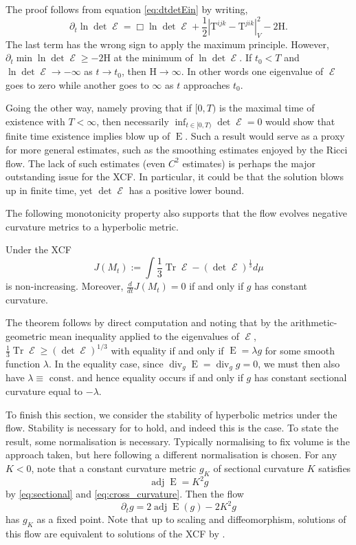 \documentclass{cambridge7a}
\renewcommand{\~}{\tilde}
\renewcommand{\-}{\bar}
\newcommand{\8}{\infty}
\newcommand{\abs}[1]{\left\lvert{#1}\right\rvert}
\DeclareMathOperator{\Tr}{Tr}
\DeclareMathOperator{\dive}{div}
\DeclareMathOperator{\Ein}{E}
\DeclareMathOperator{\opEin}{\mathcal{E}}
\DeclareMathOperator{\adj}{adj}
\begin{document}
The proof follows from equation \eqref{eq:dtdetEin} by writing,
\[
\partial_t \ln \det \opEin = \Box \ln \det \opEin + \frac{1}{2}\abs{\mathrm{T}^{ijk} - \mathrm{T}^{jik}}_V^2- 2 \mathrm{H}.
\]
The last term has the wrong sign to apply the maximum principle. However, \(\partial_t \min \ln \det\opEin \geq -2 \mathrm{H}\) at the minimum of \(\ln \det\opEin\). If $t_0<T$ and \(\ln\det\opEin \to -\infty\) as $t\to t_0$, then \(\mathrm{H} \to \infty\). In other words one eigenvalue of \(\opEin\) goes to zero while another goes to \(\infty\) as $t$ approaches $t_0$.

Going the other way, namely proving that if \([0, T)\) is the maximal time of existence with \(T < \infty\), then necessarily \(\inf_{t \in [0, T)} \det \opEin = 0\) would show that finite time existence implies blow up of \(\Ein\). Such a result would serve as a proxy for more general estimates, such as the smoothing estimates enjoyed by the Ricci flow. The lack of such estimates (even \(C^2\) estimates) is perhaps the major outstanding issue for the XCF. In particular, it could be that the solution blows up in finite time, yet \(\det \opEin\) has a positive lower bound.

The following monotonicity property also supports  that the flow evolves negative curvature metrics to a hyperbolic metric.

\begin{thm}[{\cite[Theorem 8]{MR2055396}}]
\label{thm:hyperbolicity}
Under the XCF
\[J(M_t):=\int \frac{1}{3} \Tr \opEin - (\det\opEin)^{\frac{1}{3}}d\mu\]
is non-increasing. Moreover, \(\frac{d}{dt}J(M_t) = 0\) if and only if $g$ has constant curvature.
\end{thm}

The theorem follows by direct computation and noting that by the arithmetic-geometric mean inequality applied to the eigenvalues of \(\opEin\), \(\tfrac{1}{3} \Tr\opEin \geq (\det \opEin)^{1/3}\) with equality if and only if \(\Ein = \lambda g\) for some smooth function \(\lambda\). In the equality case, since \(\dive_g \Ein = \dive_g g = 0\), we must then also have \(\lambda \equiv \text{ const.}\) and hence equality occurs if and only if \(g\) has constant sectional curvature equal to \(-\lambda\).

To finish this section, we consider the stability of hyperbolic metrics under the flow. Stability is necessary for  to hold, and indeed this is the case. To state the result, some normalisation is necessary. Typically normalising to fix volume is the approach taken, but here following \cite{MR2448593} a different normalisation is chosen. For any \(K < 0\), note that a constant curvature metric \(g_K\) of sectional curvature \(K\) satisfies
\[
\adj\Ein = K^2 g
\]
by \eqref{eq:sectional} and \eqref{eq:cross_curvature}. Then the flow
\[
\partial_t g = 2\adj\Ein(g) - 2K^2 g
\]
has \(g_K\) as a fixed point. Note that up to scaling and diffeomorphism, solutions of this flow are equivalent to solutions of the XCF by \cite[Lemma 1]{MR2448593}.
\end{document}
